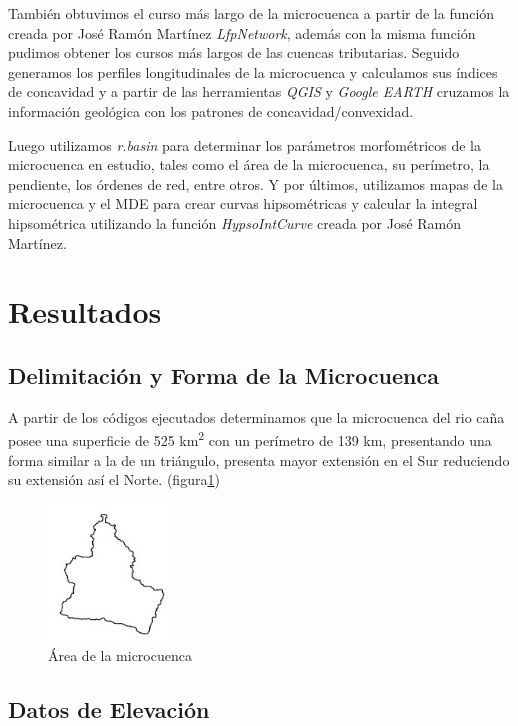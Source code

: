 \documentclass[11pt,]{article}
\begin{document}
También obtuvimos el curso más largo de la microcuenca a partir de la
función creada por José Ramón Martínez \emph{LfpNetwork}, además con la
misma función pudimos obtener los cursos más largos de las cuencas
tributarias. Seguido generamos los perfiles longitudinales de la
microcuenca y calculamos sus índices de concavidad y a partir de las
herramientas \emph{QGIS} y \emph{Google EARTH} cruzamos la información
geológica con los patrones de concavidad/convexidad.

Luego utilizamos \emph{r.basin} para determinar los parámetros
morfométricos de la microcuenca en estudio, tales como el área de la
microcuenca, su perímetro, la pendiente, los órdenes de red, entre
otros. Y por últimos, utilizamos mapas de la microcuenca y el MDE para
crear curvas hipsométricas y calcular la integral hipsométrica
utilizando la función \emph{HypsoIntCurve} creada por José Ramón
Martínez.

\section{Resultados}\label{resultados}

\subsection{Delimitación y Forma de la
Microcuenca}\label{delimitaciuxf3n-y-forma-de-la-microcuenca}

A partir de los códigos ejecutados determinamos que la microcuenca del
rio caña posee una superficie de 525 km\textsuperscript{2} con un
perímetro de 139 km, presentando una forma similar a la de un triángulo,
presenta mayor extensión en el Sur reduciendo su extensión así el Norte.
(figura\ref{areacuenca})

\begin{figure}
\centering
\includegraphics[width=0.30000\textwidth]{area_cana.jpg}
\caption{Área de la microcuenca\label{areacuenca}}
\end{figure}

\subsection{Datos de Elevación}\label{datos-de-elevaciuxf3n}
\end{document}
